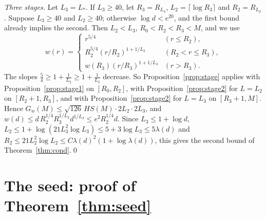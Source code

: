 \documentclass[11pt]{amsart}
\theoremstyle{definition}
\begin{document}
\smallskip\noindent\emph{Three stages.} Let $L_3=L_*$. If $L_3\ge40$, let $R_3=R_{L_3}$, $L_2=\lceil\log R_3\rceil$ and $R_2=R_{L_2}$. Suppose $L_3\ge40$ and $L_2\ge40$; otherwise $\log d<e^{20}$, and the first bound already implies the second. Then $L_2<L_3$, $R_0<R_2<R_3<M$, and we use
\[
w(r)=\begin{cases}r^{5/4}&(r\le R_2),\\ R_2^{5/4}(r/R_2)^{1+1/L_2}&(R_2<r\le R_3),\\ w(R_3)(r/R_3)^{1+1/L_3}&(r>R_3).\end{cases}
\]
The slopes $\frac54\ge1+\frac1{L_2}\ge1+\frac1{L_3}$ decrease. So Proposition~\ref{prop:stage} applies with Proposition~\ref{prop:stage1} on $[R_0,R_2]$, with Proposition~\ref{prop:stage2} for $L=L_2$ on $[R_2+1,R_3]$, and with Proposition~\ref{prop:stage2} for $L=L_3$ on $[R_3+1,M]$. Hence $G_w(M)\le\sqrt{126}\,HS(M)\cdot2L_2\cdot2L_3$, and $w(d)\le d\,R_2^{1/4}R_3^{1/L_2}d^{1/L_3}\le e^2R_2^{1/4}d$. Since $L_3\le1+\log d$, $L_2\le1+\log(21L_3^2\log L_3)\le5+3\log L_3\le5\lambda(d)$ and $R_2\le21L_2^2\log L_2\le C\lambda(d)^2(1+\log\lambda(d))$, this gives the second bound of Theorem~\ref{thm:cond}.\qed

\section{The seed: proof of Theorem~\ref{thm:seed}}\label{sec:seed}
\end{document}
